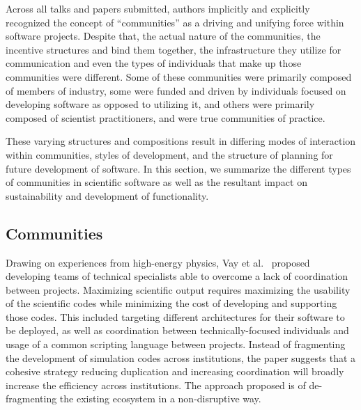 \documentclass[11pt, oneside]{amsart}
\begin{document}
Across all talks and papers submitted, authors implicitly and explicitly
recognized the concept of ``communities'' as a driving and unifying force
within software projects.  Despite that, the actual nature of the communities,
the incentive structures and bind them together, the infrastructure they
utilize for communication and even the types of individuals that make up those
communities were different.  Some of these communities were primarily composed
of members of industry, some were funded and driven by individuals focused on
developing software as opposed to utilizing it, and others were primarily
composed of scientist practitioners, and were true communities of practice.

These varying structures and compositions result in differing modes of
interaction within communities, styles of development, and the structure of
planning for future development of software.  In this section, we summarize
the different types of communities in scientific software as well as the
resultant impact on sustainability and development of functionality.

\subsection{Communities}


Drawing on experiences from high-energy physics, Vay et al.~\cite{Vay_WSSSPE} proposed
developing teams of technical specialists able to overcome a lack of
coordination between projects.  Maximizing scientific output requires
maximizing the usability of the scientific codes while minimizing the cost of
developing and supporting those codes.  This included targeting different
architectures for their software to be deployed, as well as coordination
between technically-focused individuals and usage of a common scripting
language between projects.  Instead of fragmenting the development of
simulation codes across institutions, the paper suggests that a cohesive
strategy reducing duplication and increasing coordination will broadly increase
the efficiency across institutions.  The approach proposed is of de-fragmenting
the existing ecosystem in a non-disruptive way.
\end{document}
